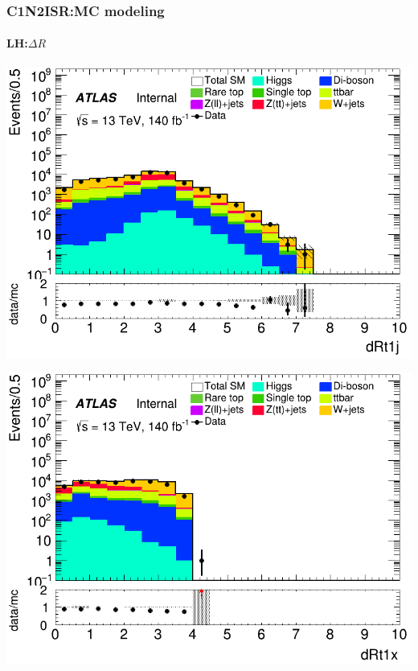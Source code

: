 \documentclass[usenames,dvipsnames]{beamer}
\begin{document}
\begin{frame}
\frametitle{C1N2ISR:MC modeling}
\framesubtitle{LH:\quad $\Delta R$}
    \begin{minipage}{0.32\textwidth}
        \centering
        \includegraphics[width=\textwidth]{graphics/LH_met/LH_met_dRt1j.png}
    \end{minipage}
    \hfill
    \begin{minipage}{0.32\textwidth}
        \centering
        \includegraphics[width=\textwidth]{graphics/LH_met/LH_met_dRt1x.png}
    \end{minipage}
    \hfill
    \begin{minipage}{0.32\textwidth}
        \centering

\end{minipage}
\end{frame}
\end{document}
